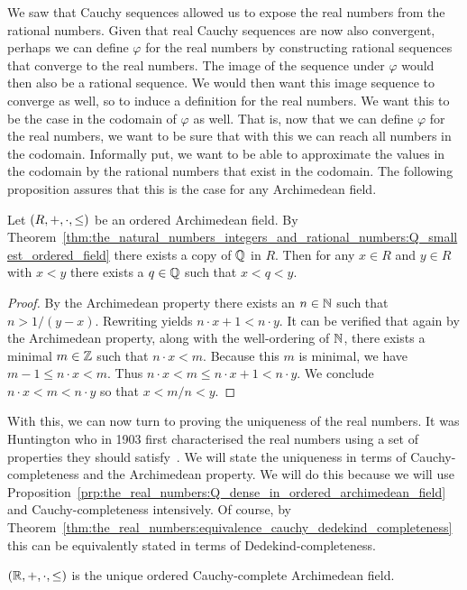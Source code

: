 \documentclass[../main.tex]{subfiles}
\begin{document}
We saw that Cauchy sequences allowed us to expose the real numbers from the rational numbers. Given that real Cauchy sequences are now also convergent, perhaps we can define $\varphi$ for the real numbers by constructing rational sequences that converge to the real numbers. The image of the sequence under $\varphi$ would then also be a rational sequence. We would then want this image sequence to converge as well, so to induce a definition for the real numbers. We want this to be the case in the codomain of $\varphi$ as well. That is, now that we can define $\varphi$ for the real numbers, we want to be sure that with this we can reach all numbers in the codomain. Informally put, we want to be able to approximate the values in the codomain by the rational numbers that exist in the codomain. The following proposition assures that this is the case for any Archimedean field.
\begin{proposition}\label{prp:the_real_numbers:Q_dense_in_ordered_archimedean_field}
    Let $(R,+,\linebreak\cdot,\leq)$ be an ordered Archimedean field. By Theorem~\ref{thm:the_natural_numbers_integers_and_rational_numbers:Q_smallest_ordered_field} there exists a copy of $\mathbb{Q}$ in $R$. Then for any $x\in R$ and $y\in R$ with $x<y$ there exists a $q\in\mathbb{Q}$ such that $x<q<y$.
\end{proposition}
\begin{proof}
    By the Archimedean property there exists an $n\in\mathbb{N}$ such that $n>1/(y-x)$. Rewriting yields $n\cdot x+1<n\cdot y$. It can be verified that again by the Archimedean property, along with the well-ordering of $\mathbb{N}$, there exists a minimal $m\in\mathbb{Z}$ such that $n\cdot x<m$. Because this $m$ is minimal, we have $m-1\leq n\cdot x<m$. Thus $n\cdot x<m\leq n\cdot x+1<n\cdot y$. We conclude $n\cdot x<m<n\cdot y$ so that $x<m/n<y$.
\end{proof}
With this, we can now turn to proving the uniqueness of the real numbers. It was Huntington who in 1903 first characterised the real numbers using a set of properties they should satisfy~\cite{Huntington1903}. We will state the uniqueness in terms of Cauchy-completeness and the Archimedean property. We will do this because we will use Proposition~\ref{prp:the_real_numbers:Q_dense_in_ordered_archimedean_field} and Cauchy-completeness intensively. Of course, by Theorem~\ref{thm:the_real_numbers:equivalence_cauchy_dedekind_completeness} this can be equivalently stated in terms of Dedekind-completeness.
\begin{theorem}\label{thm:the_real_numbers:uniqueness_R}
    $(\mathbb{R},+,\cdot,\leq)$ is the unique ordered Cauchy-complete Archimedean field.
\end{theorem}
\end{document}
